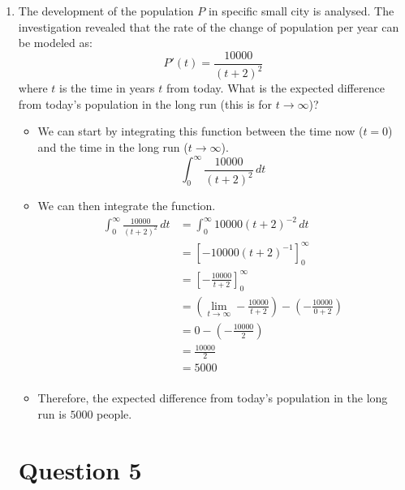 \documentclass[12pt]{article}
\begin{document}
\begin{enumerate}[leftmargin=\labelsep]
    \item The development of the population $P$ in specific small city is analysed. The investigation
    revealed that the rate of the change of population per year can be modeled as:
    \begingroup
    \large
    \begin{equation*}
        P'(t) = \frac{10000}{(t+2)^2}
    \end{equation*}
    \endgroup
    where $t$ is the time in years $t$ from today. What is the expected difference from today's population
    in the long run (this is for $t \to \infty$)?
    \begin{itemize}[label={}]
        \item We can start by integrating this function between the time now ($t=0$) and the time in the long run ($t \to \infty$).
        \begin{equation*}
            \int_{0}^{\infty} \frac{10000}{(t+2)^2} \, dt
        \end{equation*}
        \item We can then integrate the function.
        \begin{equation*}
            \begin{aligned}
                \int_{0}^{\infty} \frac{10000}{(t+2)^2} \, dt &= \int_{0}^{\infty} 10000(t+2)^{-2} \, dt \\
                &= \left[ -10000(t+2)^{-1} \right]_{0}^{\infty} \\
                &= \left[ -\frac{10000}{t+2} \right]_{0}^{\infty} \\
                &= \left(\lim_{t \to \infty}  -\frac{10000}{t+2} \right) - \left( -\frac{10000}{0+2} \right) \\
                &= 0 - \left( -\frac{10000}{2} \right) \\
                &= \frac{10000}{2} \\
                &= 5000 \\
            \end{aligned}
        \end{equation*}
        \item Therefore, the expected difference from today's population in the long run is $5000$ people.
    \end{itemize}

    \newpage

    \section*{Question 5}


\end{enumerate}
\end{document}

